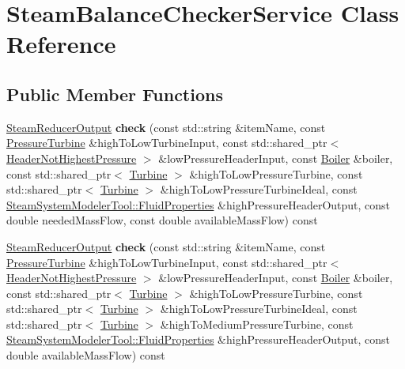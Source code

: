 \hypertarget{class_steam_balance_checker_service}{}\section{Steam\+Balance\+Checker\+Service Class Reference}
\label{class_steam_balance_checker_service}
\subsection*{Public Member Functions}
\begin{DoxyCompactItemize}
\item 
\mbox{\label{class_steam_balance_checker_service_a04607d0e0f71f3455f84cfd09d84afe5}} 
\hyperlink{class_steam_reducer_output}{Steam\+Reducer\+Output} {\bfseries check} (const std\+::string \&item\+Name, const \hyperlink{class_pressure_turbine}{Pressure\+Turbine} \&high\+To\+Low\+Turbine\+Input, const std\+::shared\+\_\+ptr$<$ \hyperlink{class_header_not_highest_pressure}{Header\+Not\+Highest\+Pressure} $>$ \&low\+Pressure\+Header\+Input, const \hyperlink{class_boiler}{Boiler} \&boiler, const std\+::shared\+\_\+ptr$<$ \hyperlink{class_turbine}{Turbine} $>$ \&high\+To\+Low\+Pressure\+Turbine, const std\+::shared\+\_\+ptr$<$ \hyperlink{class_turbine}{Turbine} $>$ \&high\+To\+Low\+Pressure\+Turbine\+Ideal, const \hyperlink{struct_steam_system_modeler_tool_1_1_fluid_properties}{Steam\+System\+Modeler\+Tool\+::\+Fluid\+Properties} \&high\+Pressure\+Header\+Output, const double needed\+Mass\+Flow, const double available\+Mass\+Flow) const
\item 
\mbox{\label{class_steam_balance_checker_service_a8b55108b5a59c4512d1bb435ef6dc41d}} 
\hyperlink{class_steam_reducer_output}{Steam\+Reducer\+Output} {\bfseries check} (const std\+::string \&item\+Name, const \hyperlink{class_pressure_turbine}{Pressure\+Turbine} \&high\+To\+Low\+Turbine\+Input, const std\+::shared\+\_\+ptr$<$ \hyperlink{class_header_not_highest_pressure}{Header\+Not\+Highest\+Pressure} $>$ \&low\+Pressure\+Header\+Input, const \hyperlink{class_boiler}{Boiler} \&boiler, const std\+::shared\+\_\+ptr$<$ \hyperlink{class_turbine}{Turbine} $>$ \&high\+To\+Low\+Pressure\+Turbine, const std\+::shared\+\_\+ptr$<$ \hyperlink{class_turbine}{Turbine} $>$ \&high\+To\+Low\+Pressure\+Turbine\+Ideal, const std\+::shared\+\_\+ptr$<$ \hyperlink{class_turbine}{Turbine} $>$ \&high\+To\+Medium\+Pressure\+Turbine, const \hyperlink{struct_steam_system_modeler_tool_1_1_fluid_properties}{Steam\+System\+Modeler\+Tool\+::\+Fluid\+Properties} \&high\+Pressure\+Header\+Output, const double available\+Mass\+Flow) const

\end{DoxyCompactItemize}
